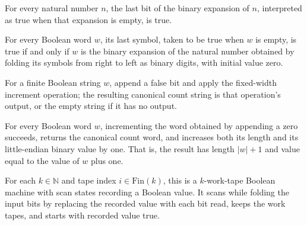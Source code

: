 \begin{lemma}
\label{Turing.MachineFormat.canonBits_bits}
\leanok
{}
For every natural number $n$, the last bit of the binary expansion of $n$, interpreted
as true when that expansion is empty, is true.
\end{lemma}

\begin{lemma}
\label{Turing.MachineFormat.canonBitsOK_iff}
\leanok
{}
For every Boolean word $w$, its last symbol, taken to be true when $w$ is empty, is true
if and only if $w$ is the binary expansion of the natural number obtained by folding its
symbols from right to left as binary digits, with initial value zero.
\end{lemma}

\begin{definition}
\label{Turing.MachineFormat.canonCount}
\leanok
{}
For a finite Boolean string $w$, append a false bit and apply the fixed-width increment
operation; the resulting canonical count string is that operation's output, or the empty
string if it has no output.
\end{definition}

\begin{lemma}
\label{Turing.MachineFormat.canonCount_spec}
\leanok
{}
For every Boolean word $w$, incrementing the word obtained by appending a zero succeeds,
returns the canonical count word, and increases both its length and its little-endian
binary value by one. That is, the result has length $|w|+1$ and value equal to the value
of $w$ plus one.
\end{lemma}

\begin{definition}
\label{Turing.MachineFormat.canonBitsTM}
\leanok
{}
For each $k\in\mathbb{N}$ and tape index $i\in\mathrm{Fin}(k)$, this is a $k$-work-tape
Boolean machine with scan states recording a Boolean value. It scans while folding the
input bits by replacing the recorded value with each bit read, keeps the work tapes, and
starts with recorded value true.
\end{definition}

